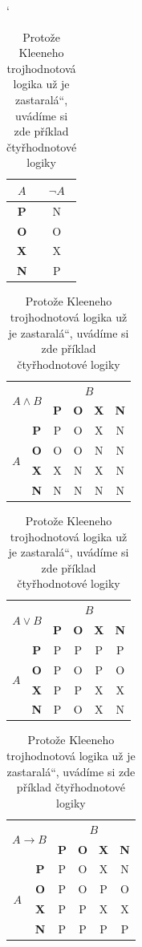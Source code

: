 \documentclass[a4paper,11pt,titlepage]{article}
\newcommand{\myuv}[1]{\quotedblbase #1\textquotedblleft}
\begin{document}
\begin{table}[h]
\begin{center}
\catcode`
    \begin{tabular}{|c|c|} \hline
        $A$ & $\neg A$\\ \hline
        \textbf{P} & N\\ \hline
        \textbf{O} & O\\ \hline
        \textbf{X} & X\\ \hline
        \textbf{N} & P\\ \hline
    \end{tabular} 
    \begin{tabular}{|c|c|c|c|c|c|} \hline
        \multicolumn{2}{|c|}{\multirow{2}{*}{$A \wedge B$}} & \multicolumn{4}{|c|}{$B$}\\ \cline{3-6}
        \multicolumn{2}{|c|}{} & \textbf{P} & \textbf{O} & \textbf{X} & \textbf{N}\\ \hline
        & \textbf{P} & P & O & X & N\\ \cline{2-6}
        \multirow{2}{*}{$A$} & \textbf{O} & O & O & N & N\\ \cline{2-6}
        & \textbf{X} & X & N & X & N\\ \cline{2-6}
        & \textbf{N} & N & N & N & N\\ \hline
    \end{tabular}
    \begin{tabular}{|c|c|c|c|c|c|} \hline
        \multicolumn{2}{|c|}{\multirow{2}{*}{$A \vee B$}} & \multicolumn{4}{|c|}{$B$}\\ \cline{3-6}
        \multicolumn{2}{|c|}{} & \textbf{P} & \textbf{O} & \textbf{X} & \textbf{N}\\ \hline
        & \textbf{P} & P & P & P & P\\ \cline{2-6}
        \multirow{2}{*}{$A$} & \textbf{O} & P & O & P & O\\ \cline{2-6}
        & \textbf{X} & P & P & X & X\\ \cline{2-6}
        & \textbf{N} & P & O & X & N\\ \hline
    \end{tabular}
      \begin{tabular}{|c|c|c|c|c|c|} \hline
        \multicolumn{2}{|c|}{\multirow{2}{*}{$A \rightarrow B$}} & \multicolumn{4}{|c|}{$B$}\\ \cline{3-6}
        \multicolumn{2}{|c|}{} & \textbf{P} & \textbf{O} & \textbf{X} & \textbf{N}\\ \hline
        & \textbf{P} & P & O & X & N\\ \cline{2-6}
        \multirow{2}{*}{$A$} & \textbf{O} & P & O & P & O\\ \cline{2-6}
        & \textbf{X} & P & P & X & X\\ \cline{2-6}
        & \textbf{N} & P & P & P & P\\ \hline
    \end{tabular}
\caption{Protože Kleeneho trojhodnotová logika už je \myuv{zastaralá}, uvádíme si zde příklad čtyřhodnotové
logiky}
\label{tab:Kleene}
\end{center}
\end{table}
\end{document}

